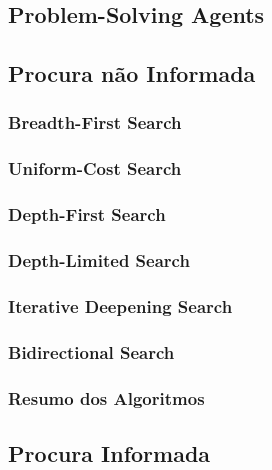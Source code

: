 \documentclass[12pt]{article}
\begin{document}
\subsection{Problem-Solving Agents}


\subsection{Procura não Informada}



\subsubsection{Breadth-First Search}



\subsubsection{Uniform-Cost Search}



\subsubsection{Depth-First Search}



\subsubsection{Depth-Limited Search}



\subsubsection{Iterative Deepening Search}



\subsubsection{Bidirectional Search}



\subsubsection*{Resumo dos Algoritmos}



\newpage

\subsection{Procura Informada}
\end{document}
